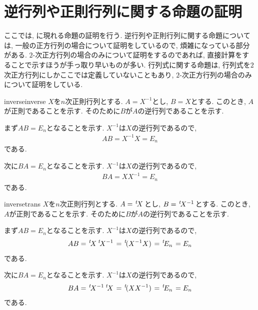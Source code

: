 \section{逆行列や正則行列に関する命題の証明}
ここでは, に現れる命題の証明を行う.
逆行列や正則行列に関する命題については,
一般の正方行列の場合について証明をしているので,
煩雑になっている部分がある.
$2$-次正方行列の場合のみについて証明をするのであれば,
直接計算をすることで示すほうが手っ取り早いものが多い.
行列式に関する命題は,
行列式を$2$次正方行列にしかここでは定義していないこともあり,
$2$-次正方行列の場合のみについて証明をしている.



\begin{proofof*}{inverse}{inverse}
  $X$を$n$次正則行列とする.
  $A=X^{-1}$とし,
  $B=X$とする.
  このとき, $A$が正則であることを示す.
  そのために$B$が$A$の逆行列であることを示す.

  まず$AB=E_n$となることを示す.
  $X^{-1}$は$X$の逆行列であるので,
  \begin{align*}
    AB=X^{-1}X=E_n
  \end{align*}
  である.

  次に$BA=E_n$となることを示す.
  $X^{-1}$は$X$の逆行列であるので,
  \begin{align*}
    BA=XX^{-1}=E_n
  \end{align*}
  である.
\end{proofof*}

\begin{proofof*}{inverse}{trans}
  $X$を$n$次正則行列とする.
  $A={\left.^{t}\!X\right.}$とし,
  $B={\left.^{t}\!X^{-1}\right.}$とする.
  このとき, $A$が正則であることを示す.
  そのために$B$が$A$の逆行列であることを示す.

  まず$AB=E_n$となることを示す.
  $X^{-1}$は$X$の逆行列であるので,
  \begin{align*}
    AB={\left.^{t}\!X\right.}{\left.^{t}\!X^{-1}\right.}={\left.^{t}\!(X^{-1}X)\right.}={\left.^{t}\!E_n\right.}=E_n
  \end{align*}
  である.

  次に$BA=E_n$となることを示す.
  $X^{-1}$は$X$の逆行列であるので,
  \begin{align*}
    BA={\left.^{t}\!X^{-1}\right.}{\left.^{t}\!X\right.}={\left.^{t}\!(XX^{-1})\right.}={\left.^{t}\!E_n\right.}=E_n
  \end{align*}
  である.
\end{proofof*}


